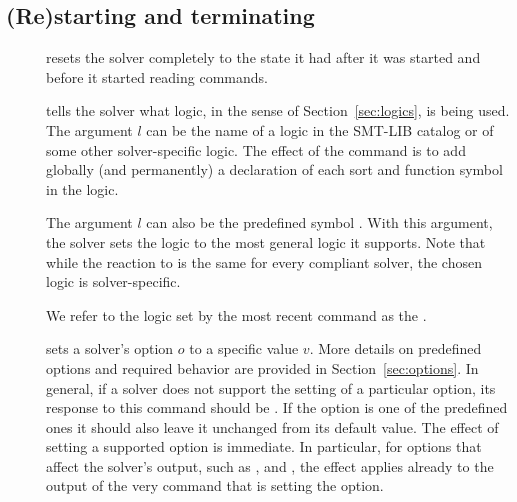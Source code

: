 \subsection{(Re)starting and terminating} \label{sec:restarting}

\begin{description}

%
\item[]
resets the solver completely to the state it had after it was started
and before it started reading commands.
\smallskip

%
\item[]
tells the solver what logic, in the sense of Section~\ref{sec:logics},
is being used.
The argument $l$ can be the name of a logic in the SMT-LIB catalog or 
of some other solver-specific logic.
The effect of the command is to add globally (and permanently)
a declaration of each sort and function symbol in the logic.

The argument $l$ can also be the predefined symbol .
With this argument, the solver sets the logic to the most general logic 
it supports.
Note that while the reaction to  is the same 
for every compliant solver, the chosen logic is solver-specific.

We refer to the logic set by the most recent  command as 
the .
\smallskip

%
\item[]
sets a solver's option $o$ to a specific value $v$.
More details on predefined options and required behavior are provided 
in Section~\ref{sec:options}.  
In general, if a solver does not support the setting of a particular option,
its response to this command should be .
If the option is one of the predefined ones it should also leave it unchanged 
from its default value.  
The effect of setting a supported option is immediate.
In particular, for options that affect the solver's output, such as 
,  and 
, 
the effect applies already to the output of the very command 
that is setting the option.


\end{description}
